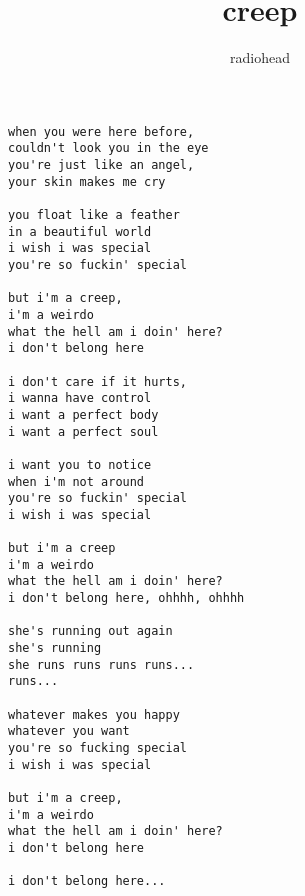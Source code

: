 \author{radiohead}
\title{creep}
\maketitle
\begin{verbatim}
when you were here before,
couldn't look you in the eye
you're just like an angel,
your skin makes me cry

you float like a feather
in a beautiful world
i wish i was special
you're so fuckin' special

but i'm a creep,
i'm a weirdo
what the hell am i doin' here?
i don't belong here

i don't care if it hurts,
i wanna have control
i want a perfect body
i want a perfect soul

i want you to notice
when i'm not around
you're so fuckin' special
i wish i was special

but i'm a creep
i'm a weirdo
what the hell am i doin' here?
i don't belong here, ohhhh, ohhhh

she's running out again
she's running
she runs runs runs runs...
runs...

whatever makes you happy
whatever you want
you're so fucking special
i wish i was special

but i'm a creep,
i'm a weirdo
what the hell am i doin' here?
i don't belong here

i don't belong here...
\end{verbatim}